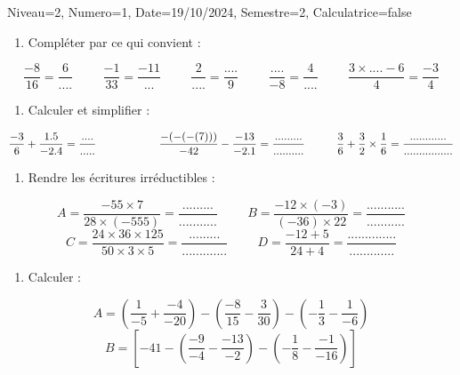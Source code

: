 \documentclass[a4paper,12pt]{article}
\begin{document}
\begin{Maquette}[DS]{Niveau=2, Numero=1, Date=19/10/2024, Semestre=2, Calculatrice=false}

\begin{exercice}
\begin{enumerate}
\item{} Compléter par ce qui convient :
\end{enumerate}
\[\dfrac{-8}{16}=\dfrac{6}{....} \hspace{1cm}
\dfrac{-1}{33}=\dfrac{-11}{...}\hspace{1cm}
\dfrac{2}{....}=\dfrac{....}{9} \hspace{1cm}
\dfrac{....}{-8}=\dfrac{4}{....}\hspace{1cm}
\dfrac{3\times .... -6}{4}=\dfrac{-3}{4}\]

\end{exercice}

\begin{exercice}
\begin{enumerate}
\item{} Calculer et simplifier :
\end{enumerate}
$\dfrac{-3}{6}+\dfrac{1.5}{-2.4}=\dfrac{....}{.....}\hspace{2cm}
\dfrac{-(-(-(7)))}{-42}-\dfrac{-13}{-2.1}=\dfrac{.........}{..........}\hspace*{1cm} \dfrac{3}{6}+\dfrac{3}{2}\times \dfrac{1}{6}=\dfrac{............}{................}$
\end{exercice}


\begin{exercice}
\begin{enumerate}
\item{} Rendre les écritures irréductibles :
\end{enumerate}
\[A=\dfrac{-55\times7}{28\times(-555)} =\dfrac{.........}{...........}\hspace{1cm}
B=\dfrac{-12\times(-3)}{(-36)\times22}=\dfrac{...........}{...........}\]
\[C=\dfrac{24\times36\times125}{50\times3\times5}=\dfrac{.........}{.............} \hspace{1cm}
D=\dfrac{-12+5}{24+4}=\dfrac{..............}{.............}\]
\end{exercice}

\begin{exercice}
\begin{enumerate}
\item{} Calculer :
\end{enumerate}
\begin{multicols}{2}
$$A=\left( \dfrac{1}{-5}+\dfrac{-4}{-20}\right) -\left(\dfrac{-8}{15}-\dfrac{3}{30}\right) -\left( -\dfrac{1}{3}-\dfrac{1}{-6} \right)$$
\anserline[8]
\columnbreak
$$B= \left[-41-\left( \dfrac{-9}{-4}-\dfrac{-13}{-2}\right) -\left( -\dfrac{1}{8}-\dfrac{-1}{-16} \right)\right]$$
\anserline[8]
\end{multicols}
\begin{multicols}{2}
\anserline[8]
\columnbreak
\anserline[8]
\end{multicols}
\end{exercice}


\end{Maquette}
\end{document}
